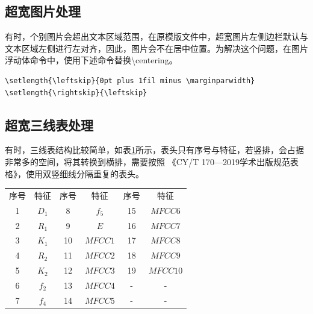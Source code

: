 \subsection{超宽图片处理}
有时，个别图片会超出文本区域范围，在原模版文件中，超宽图片左侧边栏默认与文本区域左侧进行左对齐，因此，图片会不在居中位置。为解决这个问题，在图片浮动体命令中，使用下述命令替换\textbackslash{}centering。
\begin{lstlisting}
\setlength{\leftskip}{0pt plus 1fil minus \marginparwidth}
\setlength{\rightskip}{\leftskip}
\end{lstlisting}
\subsection{超宽三线表处理}
有时，三线表结构比较简单，如表\ref{tab:chapter6_featureNumber}所示，表头只有序号与特征，若竖排，会占据非常多的空间，将其转换到横排，需要按照
《CY/T 170—2019学术出版规范表格》，使用双竖细线分隔重复的表头。
\begin{table}[htb]
    \setlength{\belowrulesep}{0pt}
    \setlength{\aboverulesep}{0pt}
    \setlength\arrayrulewidth{0.6pt}
    \centering
    \label{tab:chapter6_featureNumber}
    \wuhao
    \begin{tabular}{cc||cc||cc}
    \toprule
    序号    &   特征    &   序号    &   特征    &   序号    &   特征\\
    \hhline{--||--||--}
    1   &   $D_1$   &    8    &   $f_5$      &   15    &  $MFCC 6$     \\
    2   &   $R_1$   &    9    &   $E$        &   16    &  $MFCC 7$     \\
    3   &   $K_1$   &    10   &   $MFCC 1$   &   17    &  $MFCC 8$     \\
    4   &   $R_2$   &    11   &   $MFCC 2$   &   18    &  $MFCC 9$     \\
    5   &   $K_2$   &    12   &   $MFCC 3$   &   19    &  $MFCC 10$     \\
    6   &   $f_2$   &    13   &   $MFCC 4$   &   -     &    -   \\
    7   &   $f_4$   &    14   &   $MFCC 5$   &   -     &    -   \\
    \bottomrule
    \end{tabular}
\end{table}

